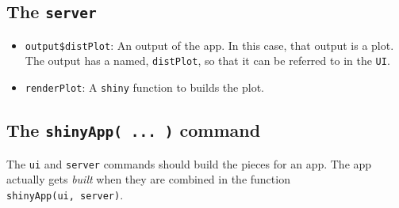 \documentclass[]{book}
\newenvironment{Shaded}{\begin{snugshade}}{\end{snugshade}}
\newcommand{\ControlFlowTok}[1]{\textcolor[rgb]{0.13,0.29,0.53}{\textbf{#1}}}
\newcommand{\DataTypeTok}[1]{\textcolor[rgb]{0.13,0.29,0.53}{#1}}
\newcommand{\DecValTok}[1]{\textcolor[rgb]{0.00,0.00,0.81}{#1}}
\newcommand{\KeywordTok}[1]{\textcolor[rgb]{0.13,0.29,0.53}{\textbf{#1}}}
\newcommand{\NormalTok}[1]{#1}
\newcommand{\OperatorTok}[1]{\textcolor[rgb]{0.81,0.36,0.00}{\textbf{#1}}}
\newcommand{\StringTok}[1]{\textcolor[rgb]{0.31,0.60,0.02}{#1}}
\begin{document}
\hypertarget{the-server}{%
\subsection*{\texorpdfstring{The \texttt{server}}{The server}}\label{the-server}}

\begin{Shaded}
\end{Shaded}

\begin{itemize}
\item
  \texttt{output\$distPlot}: An output of the app. In this case, that output is a plot. The output has a named, \texttt{distPlot}, so that it can be referred to in the \texttt{UI}.
\item
  \texttt{renderPlot}: A \texttt{shiny} function to builds the plot.
\end{itemize}

\hypertarget{the-shinyapp-...-command}{%
\subsection*{\texorpdfstring{The \texttt{shinyApp(\ ...\ )} command}{The shinyApp( ... ) command}}\label{the-shinyapp-...-command}}

The \texttt{ui} and \texttt{server} commands should build the pieces for an app. The app actually gets \emph{built} when they are combined in the function \texttt{shinyApp(ui,\ server)}.
\end{document}
